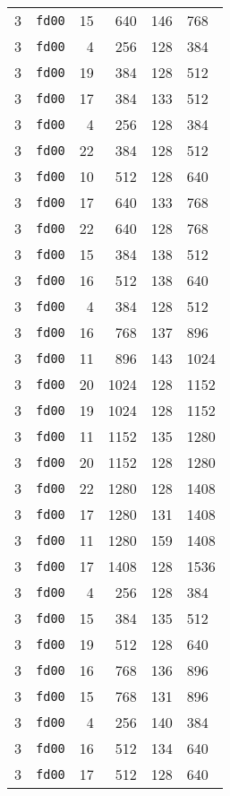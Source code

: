 \documentclass{article}
\begin{document}
\begin{table}[h!]
\begin{tabular}{llrrrl}
    3 & \texttt{fd00} & 15 & 640 & 146 & 768 \\
    3 & \texttt{fd00} & 4 & 256 & 128 & 384 \\
    3 & \texttt{fd00} & 19 & 384 & 128 & 512 \\
    3 & \texttt{fd00} & 17 & 384 & 133 & 512 \\
    3 & \texttt{fd00} & 4 & 256 & 128 & 384 \\
    3 & \texttt{fd00} & 22 & 384 & 128 & 512 \\
    3 & \texttt{fd00} & 10 & 512 & 128 & 640 \\
    3 & \texttt{fd00} & 17 & 640 & 133 & 768 \\
    3 & \texttt{fd00} & 22 & 640 & 128 & 768 \\
    3 & \texttt{fd00} & 15 & 384 & 138 & 512 \\
    3 & \texttt{fd00} & 16 & 512 & 138 & 640 \\
    3 & \texttt{fd00} & 4 & 384 & 128 & 512 \\
    3 & \texttt{fd00} & 16 & 768 & 137 & 896 \\
    3 & \texttt{fd00} & 11 & 896 & 143 & 1024 \\
    3 & \texttt{fd00} & 20 & 1024 & 128 & 1152 \\
    3 & \texttt{fd00} & 19 & 1024 & 128 & 1152 \\
    3 & \texttt{fd00} & 11 & 1152 & 135 & 1280 \\
    3 & \texttt{fd00} & 20 & 1152 & 128 & 1280 \\
    3 & \texttt{fd00} & 22 & 1280 & 128 & 1408 \\
    3 & \texttt{fd00} & 17 & 1280 & 131 & 1408 \\
    3 & \texttt{fd00} & 11 & 1280 & 159 & 1408 \\
    3 & \texttt{fd00} & 17 & 1408 & 128 & 1536 \\
    3 & \texttt{fd00} & 4 & 256 & 128 & 384 \\
    3 & \texttt{fd00} & 15 & 384 & 135 & 512 \\
    3 & \texttt{fd00} & 19 & 512 & 128 & 640 \\
    3 & \texttt{fd00} & 16 & 768 & 136 & 896 \\
    3 & \texttt{fd00} & 15 & 768 & 131 & 896 \\
    3 & \texttt{fd00} & 4 & 256 & 140 & 384 \\
    3 & \texttt{fd00} & 16 & 512 & 134 & 640 \\
    3 & \texttt{fd00} & 17 & 512 & 128 & 640 \\

\end{tabular}
\end{table}
\end{document}

